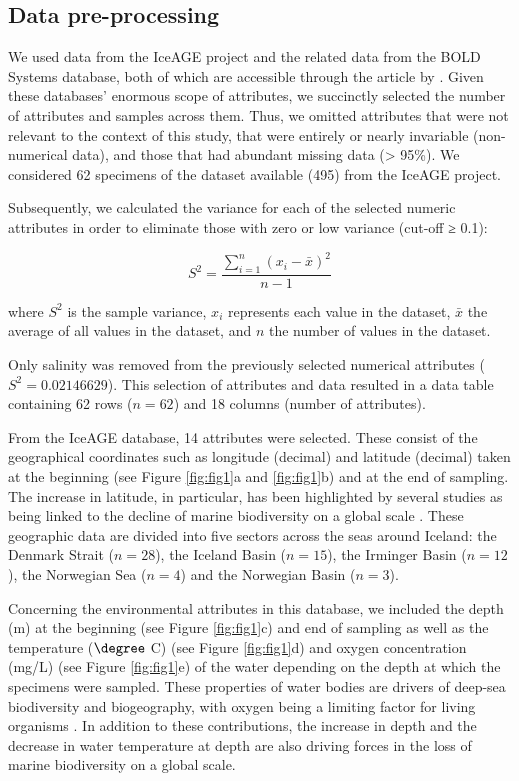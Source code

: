 \subsection{Data pre-processing}
We used data from the IceAGE project and the related data from the BOLD Systems database, both of which are accessible through the article by \cite{uhlir_adding_2021}. Given these databases’ enormous scope of attributes, we succinctly selected the number of attributes and samples across them. Thus, we omitted attributes that were not relevant to the context of this study, that were entirely or nearly invariable (non-numerical data), and those that had abundant missing data (> 95\%). We considered 62 specimens of the dataset available (495) from the IceAGE project.

Subsequently, we calculated the variance for each of the selected numeric attributes in order to eliminate those with zero or low variance (cut-off ≥ 0.1):

\begin{equation}
    S^2 = \frac{\sum_{i=1}^{n} (x_i - \bar{x})^2}{n-1}
\end{equation}

where $S^2$ is the sample variance, $x_i$ represents each value in the dataset, $\bar{x}$ the average of all values in the dataset, and $n$ the number of values in the dataset.

Only salinity was removed from the previously selected numerical attributes ($S^2 = 0.02146629$). This selection of attributes and data resulted in a data table containing 62 rows ($n=62$) and 18 columns (number of attributes). 

From the IceAGE database, 14 attributes were selected. These consist of the geographical coordinates such as longitude (decimal) and latitude (decimal) taken at the beginning (see Figure \ref{fig:fig1}a and \ref{fig:fig1}b) and at the end of sampling. The increase in latitude, in particular, has been highlighted by several studies as being linked to the decline of marine biodiversity on a global scale \citep{lambshead_latitudinal_2000,gage_diversity_2004}. These geographic data are divided into five sectors across the seas around Iceland: the Denmark Strait ($n=28$), the Iceland Basin ($n=15$), the Irminger Basin ($n=12$), the Norwegian Sea ($n=4$) and the Norwegian Basin ($n=3$). 

Concerning the environmental attributes in this database, we included the depth (m) at the beginning (see Figure \ref{fig:fig1}c) and end of sampling as well as the temperature ($\degree$ C) (see Figure \ref{fig:fig1}d) and oxygen concentration (mg/L) (see Figure \ref{fig:fig1}e) of the water depending on the depth at which the specimens were sampled. These properties of water bodies are drivers of deep-sea biodiversity and biogeography, with oxygen being a limiting factor for living organisms \citep{keeling_ocean_2010}. In addition to these contributions, the increase in depth \citep{rex_global_2006,costello_marine_2017} and the decrease in water temperature at depth \citep{lambshead_latitudinal_2000} are also driving forces in the loss of marine biodiversity on a global scale.

